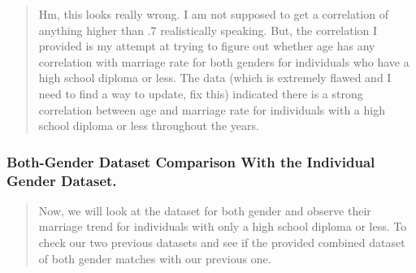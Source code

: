 \documentclass[
]{article}
\begin{document}
\begin{quote}
Hm, this looks really wrong. I am not supposed to get a correlation of
anything higher than .7 realistically speaking. But, the correlation I
provided is my attempt at trying to figure out whether age has any
correlation with marriage rate for both genders for individuals who have
a high school diploma or less. The data (which is extremely flawed and I
need to find a way to update, fix this) indicated there is a strong
correlation between age and marriage rate for individuals with a high
school diploma or less throughout the years.
\end{quote}

\hypertarget{both-gender-dataset-comparison-with-the-individual-gender-dataset.}{%
\subsubsection{Both-Gender Dataset Comparison With the Individual Gender
Dataset.}\label{both-gender-dataset-comparison-with-the-individual-gender-dataset.}}

\begin{quote}
Now, we will look at the dataset for both gender and observe their
marriage trend for individuals with only a high school diploma or less.
To check our two previous datasets and see if the provided combined
dataset of both gender matches with our previous one.
\end{quote}
\end{document}
